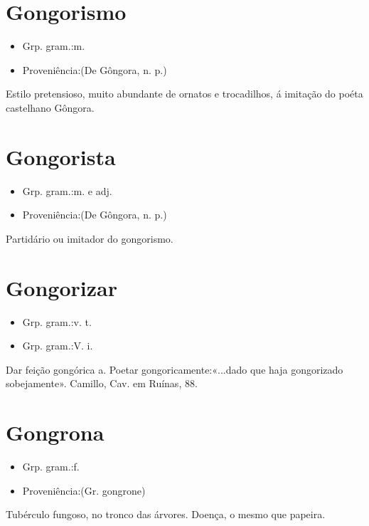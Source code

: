 \section{Gongorismo}
\begin{itemize}
\item {Grp. gram.:m.}
\end{itemize}
\begin{itemize}
\item {Proveniência:(De \textunderscore Gôngora\textunderscore , n. p.)}
\end{itemize}
Estilo pretensioso, muito abundante de ornatos e trocadilhos, á imitação do poéta castelhano Gôngora.
\section{Gongorista}
\begin{itemize}
\item {Grp. gram.:m.  e  adj.}
\end{itemize}
\begin{itemize}
\item {Proveniência:(De \textunderscore Gôngora\textunderscore , n. p.)}
\end{itemize}
Partidário ou imitador do gongorismo.
\section{Gongorizar}
\begin{itemize}
\item {Grp. gram.:v. t.}
\end{itemize}
\begin{itemize}
\item {Grp. gram.:V. i.}
\end{itemize}
Dar feição gongórica a.
Poetar gongoricamente:«\textunderscore ...dado que haja gongorizado sobejamente\textunderscore ». Camillo, \textunderscore Cav. em Ruínas\textunderscore , 88.
\section{Gongrona}
\begin{itemize}
\item {Grp. gram.:f.}
\end{itemize}
\begin{itemize}
\item {Proveniência:(Gr. \textunderscore gongrone\textunderscore )}
\end{itemize}
Tubérculo fungoso, no tronco das árvores.
Doença, o mesmo que \textunderscore papeira\textunderscore .
